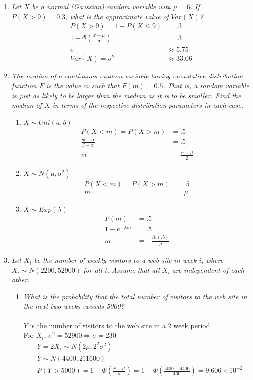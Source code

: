 \documentclass{article} %
\begin{document}
\begin{enumerate}
	\item \textit{Let $X$ be a normal (Gaussian) random variable with $\mu = 6$. If $P(X > 9) = 0.3$, what is the approximate value of $Var(X)$?}
	\begin{align*}
	P(X > 9) = 1 - P(X \leq 9) &= .3\\
	1 - \Phi(\frac{x - \mu}{\sigma}) &= .3\\
	\sigma &\approx 5.75\\
	Var(X) = \sigma^2 &\approx 33.06
	\end{align*}
	
	\item \textit{The median of a continuous random variable having cumulative distribution function $F$ is the value $m$ such that $F(m) = 0.5$. That is, a random variable is just as likely to be larger than the median as it is to be smaller. Find the median of $X$ in terms of the respective distribution parameters in each case.}
	\begin{enumerate}
		\item $X \sim Uni(a, b)$
		\begin{align*}
		P(X < m) = P(X > m) &= .5\\
		\frac{m - \alpha}{\beta - \alpha} &= .5\\
		m &= \frac{\alpha + \beta}{2}
		\end{align*}
		
		\item $X \sim N(\mu, \sigma^2)$
		\begin{align*}
		P(X < m) = P(X > m) &= .5\\
		m &= \mu
		\end{align*}
		
		\item $X \sim Exp(\lambda)$
		\begin{align*}
		F(m) &= .5\\
		1 - e^{-\lambda m} &= .5\\
		m &= -\frac{ln(.5)}{\mu}
		\end{align*}
		
	\end{enumerate}
	
	\item \textit{Let $X_i$ be the number of weekly visitors to a web site in week $i$, where $X_i \sim N(2200, 52900)$ for all $i$. Assume that all $X_i$ are independent of each other.}
	\begin{enumerate}
		\item \textit{What is the probability that the total number of visitors to the web site in the next two weeks exceeds 5000?}\\
		\\
		$Y$ is the number of visitors to the web site in a 2 week period\\
		For $X_i$, $\sigma^2 = 52900 \Rightarrow \sigma = 230$ 
		\begin{align*}
		&Y = 2X_i \sim N(2\mu, 2^2\sigma^2)\\
		&Y \sim N(4400, 211600)\\
		&P(Y > 5000) = 1 - \Phi(\frac{x - \mu}{\sigma}) = 1 - \Phi(\frac{5000 - 4400}{460}) = 9.606 \times 10^{-2}
		\end{align*}
		

\end{enumerate}
\end{enumerate}
\end{document}
